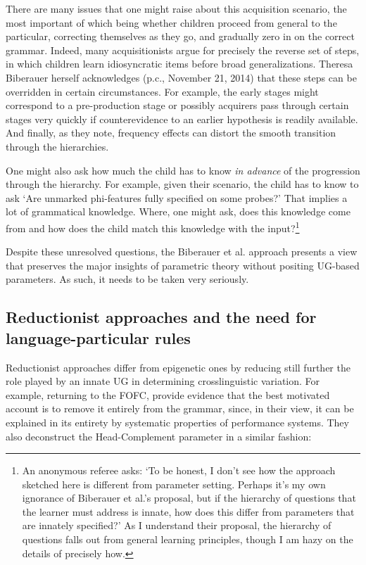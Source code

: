 \documentclass[output=paper,
modfonts
]{LSP/langsci}
\begin{document}
There are many issues that one might raise about this acquisition
scenario, the most important of which being whether children proceed
from general to the particular, correcting themselves as they go, and
gradually zero in on the correct grammar. Indeed, many acquisitionists
argue for precisely the reverse set of steps, in which children learn
idiosyncratic items before broad generalizations. Theresa Biberauer
herself acknowledges (p.c., November 21, 2014) that these steps can be
overridden in certain circumstances. For example, the early stages might
correspond to a pre-production stage or possibly acquirers pass through
certain stages very quickly if counterevidence to an earlier hypothesis
is readily available. And finally, as they note, frequency effects can
distort the smooth transition through the hierarchies.

One might also ask how much the child has to know \emph{in advance} of
the progression through the hierarchy. For example, given their
scenario, the child has to know to ask `Are unmarked phi-features fully
specified on some probes?' That implies a lot of grammatical knowledge.
Where, one might ask, does this knowledge come from and how does the
child match this knowledge with the input?\footnote{An anonymous referee
  asks: `To be honest, I don't see how the approach sketched here is
  different from parameter setting. Perhaps it's my own ignorance of
  Biberauer et al.'s proposal, but if the hierarchy of questions that
  the learner must address is innate, how does this differ from
  parameters that are innately specified?' As I understand their
  proposal, the hierarchy of questions falls out from general learning
  principles, though I am hazy on the details of precisely how.}

Despite these unresolved questions, the Biberauer et al. approach
presents a view that preserves the major insights of parametric theory
without positing UG-based parameters. As such, it needs to be taken very
seriously.

\subsection{Reductionist approaches and the need for language-particular rules}

Reductionist approaches differ from epigenetic ones by reducing still
further the role played by an innate UG in determining crosslinguistic
variation. For example, returning to the FOFC, \citet{trotzke2013} provide evidence that the best motivated account is to
remove it entirely from the grammar, since, in their view, it can be
explained in its entirety by systematic properties of performance
systems. They also deconstruct the Head-Complement parameter in a
similar fashion:
\end{document}
